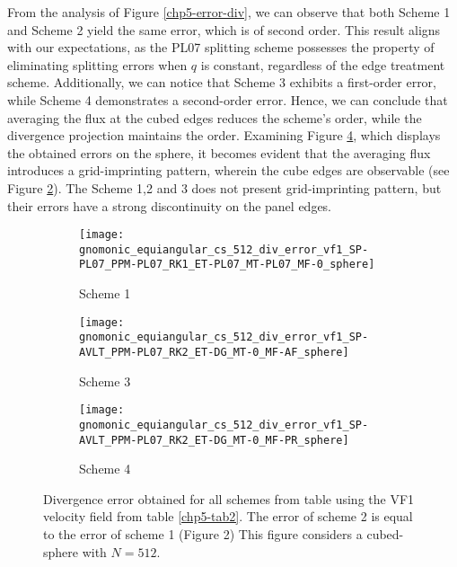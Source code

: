From the analysis of Figure \ref{chp5-error-div}, we can observe that both Scheme 1 and Scheme 2 yield the same error,
which is of second order. This result aligns with our expectations, as the PL07 splitting scheme possesses the property of eliminating
splitting errors when $q$ is constant, regardless of the edge treatment scheme.
Additionally, we can notice that Scheme 3 exhibits a first-order error, while Scheme 4 demonstrates a second-order error.
Hence, we can conclude that averaging the flux at the cubed edges reduces the scheme's order, while the divergence projection maintains the order.
Examining Figure \ref{chp5-div}, which displays the obtained errors on the sphere, it becomes evident that the averaging
flux introduces a grid-imprinting pattern, wherein the cube edges are observable (see Figure \ref{chp5-div2}).
The Scheme 1,2 and 3 does not present grid-imprinting pattern, but their errors have a strong discontinuity on the panel edges.
\begin{figure}[!htb]
	\centering
	\begin{subfigure}{0.3\textwidth}
		\centering
		\texttt{[image: gnomonic\_equiangular\_cs\_512\_div\_error\_vf1\_SP-PL07\_PPM-PL07\_RK1\_ET-PL07\_MT-PL07\_MF-0\_sphere]}
		\caption{Scheme 1 \label{chp5-div1}}
	\end{subfigure}
	\begin{subfigure}{0.3\textwidth}
	\centering
	\texttt{[image: gnomonic\_equiangular\_cs\_512\_div\_error\_vf1\_SP-AVLT\_PPM-PL07\_RK2\_ET-DG\_MT-0\_MF-AF\_sphere]}
	\caption{Scheme 3 \label{chp5-div2}}
	\end{subfigure}
	\begin{subfigure}{0.3\textwidth}
	\centering
	\texttt{[image: gnomonic\_equiangular\_cs\_512\_div\_error\_vf1\_SP-AVLT\_PPM-PL07\_RK2\_ET-DG\_MT-0\_MF-PR\_sphere]}
	\caption{Scheme 4 \label{chp5-div3}}
	\end{subfigure}
	\caption{ Divergence error obtained for all schemes from table using the VF1 velocity field from table \ref{chp5-tab2}.
		The error of scheme 2 is equal to the error of scheme 1 (Figure 2)
		This figure considers a cubed-sphere with $N=512$. \label{chp5-div}}
\end{figure}

